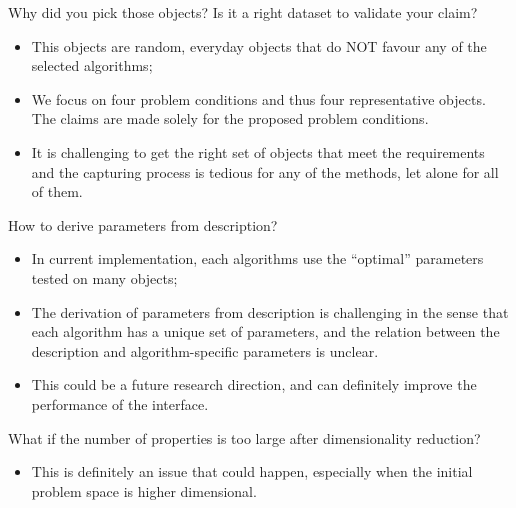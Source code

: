 \documentclass[10pt]{beamer}
\begin{document}
\appendix
\begin{frame}

\begin{alertblock}{Why did you pick those objects? Is it a right dataset to validate your claim?}
\begin{itemize}
\item This objects are random, everyday objects that do NOT favour any of the selected algorithms;
\item We focus on four problem conditions and thus four representative objects. The claims are made solely for the proposed problem conditions.
\item It is challenging to get the right set of objects that meet the requirements and the capturing process is tedious for any of the methods, let alone for all of them.
\end{itemize}
\end{alertblock}

\end{frame}

\begin{frame}

\begin{alertblock}{How to derive parameters from description?}
\begin{itemize}
\item In current implementation, each algorithms use the ``optimal'' parameters tested on many objects;
\item The derivation of parameters from description is challenging in the sense that each algorithm has a unique set of parameters, and the relation between the description and algorithm-specific parameters is unclear.
\item This could be a future research direction, and can definitely improve the performance of the interface.
\end{itemize}
\end{alertblock}

\end{frame}

\begin{frame}

\begin{alertblock}{What if the number of properties is too large after dimensionality reduction?}
\begin{itemize}
\item This is definitely an issue that could happen, especially when the initial problem space is higher dimensional.
\end{itemize}
\end{alertblock}

\end{frame}
\end{document}
